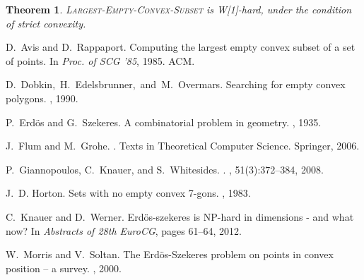 \documentclass[11pt,a4paper]{article}
\newtheorem{theorem}[definition]{Theorem}
\begin{document}
\begin{theorem}
\textsc{Largest-Empty-Convex-Subset} is W[1]-hard, under the condition of strict convexity.
\end{theorem}




\begin{thebibliography}{1}

D.~Avis and D.~Rappaport.
\newblock Computing the largest empty convex subset of a set of points.
\newblock In {\em Proc. of SCG '85}, 1985. ACM.

\mbox{D.~Dobkin, H.~Edelsbrunner, and M.~Overmars.}
\newblock \allowbreak Sear\-ching for empty convex polygons.
, 1990.

P.~Erd\"os and G.~Szekeres.
\newblock A combinatorial problem in geometry.
, 1935.

J.~Flum and M.~Grohe.
.
\newblock Texts in Theoretical Computer Science. Springer, 2006.

P.~Giannopoulos, C.~Knauer, and S.~Whitesides.
.
, 51(3):372--384, 2008.

J.~D. Horton.
\newblock Sets with no empty convex 7-gons.
, 1983.

C.~Knauer and D.~Werner.
\newblock Erd\"os-szekeres is {NP}-hard in  dimensions - and what now?
\newblock In {\em Abstracts of 28th EuroCG}, pages 61--64, 2012.

W.~Morris and V.~Soltan.
\newblock The {Erd\"os-Szekeres} problem on points in convex position -- a
  survey.
, 2000.

\end{thebibliography}
\end{document}
